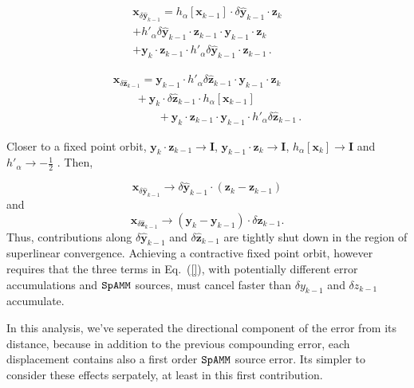 \documentclass[letterpaper,twocolumn,amsmath,amsfont,amssymb,english,aps,jcp,preprintnumbers,groupaddress,nofootinbib,tightenlines,floatfix]{revtex4}
\newcommand{\mat}[1]{\boldsymbol{#1}}
\theoremstyle{plain}
\theoremstyle{remark}
\theoremstyle{plain}
\begin{document}
\begin{multline}
  \mat{x}_{\delta \widehat{ \mat{y}}_{k-1}} = h_\alpha \left[ \mat{x}_{k-1} \right]  \cdot \delta \widehat{\mat{y}}_{k-1} \cdot \mat{z}_{k} \\
+  h'_\alpha  \delta \widehat{\mat{y}}_{k-1} \cdot \mat{z}_{k-1} \cdot  \mat{y}_{k-1} \cdot  \mat{z}_{k} \\
 + \mat{y}_{k} \cdot \mat{z}_{k-1} \cdot h'_\alpha \delta \widehat{\mat{y}}_{k-1} \cdot \mat{z}_{k-1}  \, .
\end{multline}


\begin{multline}
 \mat{x}_{\delta \widehat{ \mat{z}}_{k-1}} =  {\mat{y}}_{k-1} \cdot  h'_\alpha \delta \widehat{ \mat{z}}_{k-1} \cdot  \mat{y}_{k-1}  \cdot \mat{z}_{k} \\
\qquad + \mat{y}_k \cdot  \delta \widehat{\mat{z}}_{k-1} \cdot   h_\alpha \left[ \mat{x}_{k-1} \right] \\
\qquad \qquad +  \mat{y}_{k} \cdot  \mat{z}_{k-1} \cdot {\mat{y}}_{k-1} \cdot h'_\alpha \delta \widehat{\mat{z}}_{k-1} \, .
\end{multline}

Closer to a fixed point orbit,  $\mat{y}_k \cdot \mat{z}_{k-1} \rightarrow \mat{I}$, $\mat{y}_{k-1} \cdot \mat{z}_{k} \rightarrow \mat{I}$,
$h_\alpha \left[ \mat{x}_{k} \right] \rightarrow \mat{I}$ and $h'_\alpha \rightarrow - \frac{1}{2}$ \cite{higham2005}.  Then,

\begin{equation} \label{yorbit}
 \mat{x}_{\delta \widehat{ \mat{y}}_{k-1}} \rightarrow \delta \widehat{\mat{y}}_{k-1} \cdot \left( \mat{z}_k-\mat{z}_{k-1} \right)
\end{equation}
and
\begin{equation} \label{zorbit}
 \mat{x}_{\delta \widehat{ \mat{z}}_{k-1}} \rightarrow \left( \mat{y}_k-\mat{y}_{k-1} \right) \cdot \delta \widehat{\mat{z}}_{k-1} .
\end{equation}
Thus, contributions along $\delta \widehat{\mat{y}}_{k-1}$ and $\delta \widehat{\mat{z}}_{k-1}$ are tightly shut down in the 
region of superlinear convergence.  Achieving a contractive fixed point orbit, however requires that the three terms in Eq.~(\ref{}),  
with potentially different error accumulations and $\tt SpAMM$ sources, must cancel faster than $\delta y_{k-1}$ 
and $\delta z_{k-1}$ accumulate.

In this analysis, we've seperated the directional component of the error from its distance, because in addition to the
previous compounding error, each displacement contains also a first order $\tt SpAMM$ source error.  Its simpler to 
consider these effects serpately, at least in this first contribution. 
\end{document}
